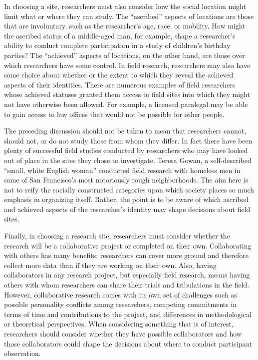 In choosing a site, researchers must also consider how the social location might limit what or where they can study. The ``ascribed'' aspects of locations are those that are involuntary, such as the researcher's age, race, or mobility. How might the ascribed status of a middle-aged man, for example, shape a researcher's ability to conduct complete participation in a study of children's birthday parties? The ``achieved'' aspects of locations, on the other hand, are those over which researchers have some control. In field research, researchers may also have some choice about whether or the extent to which they reveal the achieved aspects of their identities. There are numerous examples of field researchers whose achieved statuses granted them access to field sites into which they might not have otherwise been allowed. For example, a licensed paralegal may be able to gain access to law offices that would not be possible for other people.

The preceding discussion should not be taken to mean that researchers cannot, should not, or do not study those from whom they differ. In fact there have been plenty of successful field studies conducted by researchers who may have looked out of place in the sites they chose to investigate. Teresa Gowan, a self-described ``small, white English woman'' conducted field research with homeless men in some of San Francisco's most notoriously rough neighborhoods\cite{gowan2010hobos}. The aim here is not to reify the socially constructed categories upon which society places so much emphasis in organizing itself. Rather, the point is to be aware of which ascribed and achieved aspects of the researcher's identity may shape decisions about field sites.

Finally, in choosing a research site, researchers must consider whether the research will be a collaborative project or completed on their own. Collaborating with others has many benefits; researchers can cover more ground and therefore collect more data than if they are working on their own. Also, having collaborators in any research project, but especially field research, means having others with whom researchers can share their trials and tribulations in the field. However, collaborative research comes with its own set of challenges such as possible personality conflicts among researchers, competing commitments in terms of time and contributions to the project, and differences in methodological or theoretical perspectives. When considering something that is of interest, researchers should consider whether they have possible collaborators and how those collaborators could shape the decisions about where to conduct participant observation.

